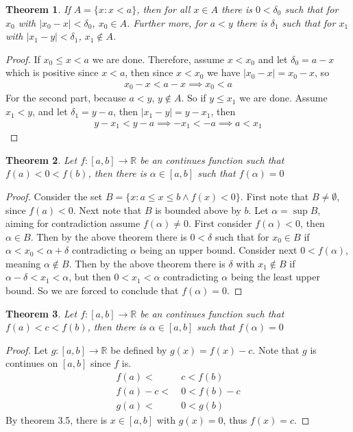 \documentclass{article}
\newtheorem{theorem}{Theorem}[section]
\begin{document}
\begin{theorem}
	If $A = \{x: x < a\}$, then for all $x \in A$ there is $0<\delta_0$ such 
	that for $x_0$ with $|x_0 - x| < \delta_0$, $x_0 \in A$. Further more, for 
	$a < y$ there is $\delta_1$ such that for $x_1$ with $|x_1-y| < \delta_1$,
	$x_1 \notin A$.
\end{theorem}
\begin{proof}
	If $x_0 \leq x < a$ we are done. Therefore, assume $x < x_0$ and let 
	$\delta_0 = a-x$ which is positive since $x < a$, then since $x < x_0$ we
	have $|x_0-x| = x_0-x$, so
	\begin{align*}
		x_0-x<a-x \implies x_0 < a
	\end{align*}
	For the second part, because $a < y$, $y \notin A$. So if $y \leq x_1$ we
	are done. Assume $x_1 < y$, and let $\delta_1 = y-a$, then $|x_1-y| =
	y-x_1$, then
	\begin{align*}
		y-x_1<y-a \implies -x_1 < -a \implies a < x_1
\end{align*}
\end{proof}
\begin{theorem}
	Let $f: [a,b] \rightarrow \mathbb{R}$ be an continues function such that
	$f(a) < 0 < f(b)$, then there is $\alpha \in [a,b]$ such that $f(\alpha) =
	0$
\end{theorem}
\begin{proof}
	Consider the set $B = \{x:a \leq x \leq b \land f(x) < 0\}$. First note that
	$B \neq \emptyset$, since $f(a) < 0$. Next note that $B$ is bounded above by
	$b$. Let $\alpha = \sup B$, aiming for contradiction assume $f(\alpha)
	\neq 0$. First consider $f(\alpha) < 0$, then $\alpha \in B$. Then by the
	above theorem there is $0 < \delta$ such that for $x_0\in B$ if $\alpha 
	< x_0 < \alpha + \delta$ contradicting $\alpha$ being an upper bound.
	Consider next $0 < f(\alpha)$, meaning $\alpha \notin B$. Then by the above 
	theorem there is $\delta$ with $x_1 \notin B$ if $\alpha - \delta < x_1 < 
	\alpha$, but then $0 < x_1 < \alpha$ contradicting $\alpha$ being the least 
	upper bound. So we are forced to conclude that $f(\alpha) = 0$.
\end{proof}
\begin{theorem}
	Let $f: [a,b] \rightarrow \mathbb{R}$ be an continues function such that
	$f(a) < c < f(b)$, then there is $\alpha \in [a,b]$ such that $f(\alpha) =
	0$
\end{theorem}
\begin{proof}
	Let $g: [a,b] \rightarrow \mathbb{R}$ be defined by $g(x) = f(x)-c$. Note
	that $g$ is continues on $[a,b]$ since $f$ is. 
	\begin{align*}
		f(a) <&\ c < f(b) \\
			f(a) - c <&\ 0 < f(b) - c \\
			g(a) <&\ 0 < g(b)
	\end{align*}
	By theorem 3.5, there is $x \in [a,b]$ with $g(x)=0$, thus $f(x)=c$.
\end{proof}
\end{document}
